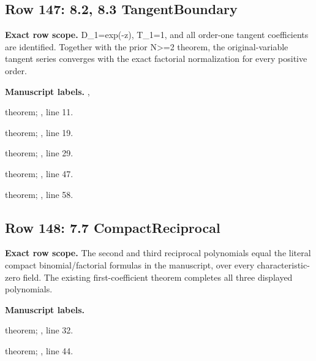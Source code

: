 \subsection{Row 147: 8.2, 8.3 TangentBoundary}
\label{row:147}
\textbf{Exact row scope.} D\_1=exp(-z), T\_1=1, and all order-one tangent coefficients are identified. Together with the prior N>=2 theorem, the original-variable tangent series converges with the exact factorial normalization for every positive order.\par\smallskip
\textbf{Manuscript labels.} , \par\smallskip
{\small{}\par}
{\footnotesize\color{muted}theorem; , line 11.\par}\smallskip
{\small{}\par}
{\footnotesize\color{muted}theorem; , line 19.\par}\smallskip
{\small{}\par}
{\footnotesize\color{muted}theorem; , line 29.\par}\smallskip
{\small{}\par}
{\footnotesize\color{muted}theorem; , line 47.\par}\smallskip
{\small{}\par}
{\footnotesize\color{muted}theorem; , line 58.\par}\smallskip
{}
\subsection{Row 148: 7.7 CompactReciprocal}
\label{row:148}
\textbf{Exact row scope.} The second and third reciprocal polynomials equal the literal compact binomial/factorial formulas in the manuscript, over every characteristic-zero field. The existing first-coefficient theorem completes all three displayed polynomials.\par\smallskip
\textbf{Manuscript labels.} \par\smallskip
{\small{}\par}
{\footnotesize\color{muted}theorem; , line 32.\par}\smallskip
{\small{}\par}
{\footnotesize\color{muted}theorem; , line 44.\par}\smallskip
{}
